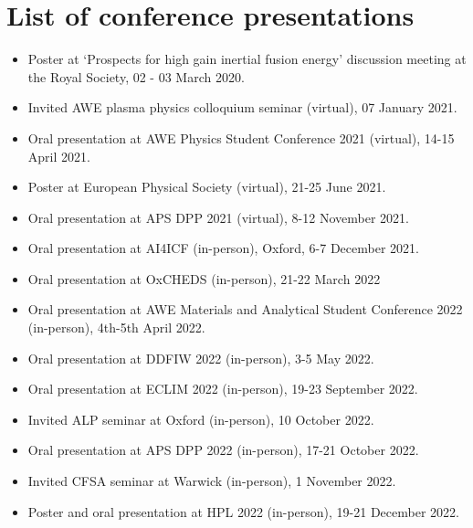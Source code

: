 \section{List of conference presentations}

\begin{itemize}
	\item Poster at `Prospects for high gain inertial fusion energy' discussion meeting at the Royal Society, 02 - 03 March 2020.
	\item Invited AWE plasma physics colloquium seminar (virtual), 07 January 2021.
	\item Oral presentation at AWE Physics Student Conference 2021 (virtual), 14-15 April 2021.
	\item Poster at European Physical Society (virtual), 21-25 June 2021.
	\item Oral presentation at APS DPP 2021 (virtual), 8-12 November 2021.
	\item Oral presentation at AI4ICF (in-person), Oxford, 6-7 December 2021.
	\item Oral presentation at OxCHEDS (in-person), 21-22 March 2022
	\item Oral presentation at AWE Materials and Analytical Student Conference 2022 (in-person), 4th-5th April 2022. 
	\item Oral presentation at DDFIW 2022 (in-person), 3-5 May 2022.
	\item Oral presentation at ECLIM 2022 (in-person), 19-23 September 2022.
	\item Invited ALP seminar at Oxford (in-person), 10 October 2022.
	\item Oral presentation at APS DPP 2022 (in-person), 17-21 October 2022.
	\item Invited CFSA seminar at Warwick (in-person), 1 November 2022.
	\item Poster and oral presentation at HPL 2022 (in-person), 19-21 December 2022.
\end{itemize}


